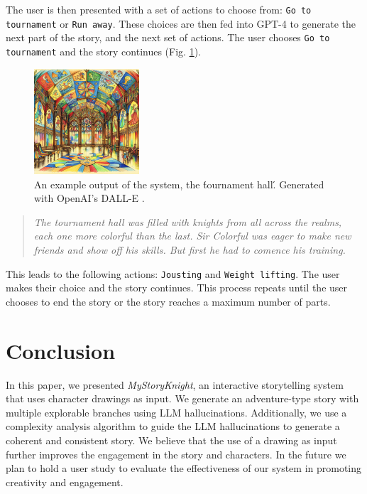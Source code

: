\documentclass[submit,techrep,english]{ipsj}
\begin{document}
The user is then presented with a set of actions to choose from: \verb|Go to tournament| or \verb|Run away|. These choices are then fed into GPT-4 to generate the next part of the story, and the next set of actions. The user chooses \verb|Go to tournament| and the story continues (Fig. \ref{fig:tournament}).

\vspace{10pt} %

\begin{figure}[h]
    \centering
    \includegraphics[width=0.35\textwidth]{figures/tournament-hall.png}
    \caption{An example output of the system, the \'tournament hall\'. Generated with OpenAI's DALL-E \cite{21:dalle}.}
    \label{fig:tournament}
\end{figure}

\begin{quote}
    \textit{The tournament hall was filled with knights from all across the realms, each one more colorful than the last. Sir Colorful was eager to make new friends and show off his skills. But first he had to comence his training.}
\end{quote}

\vspace{10pt} %

This leads to the following actions: \verb|Jousting| and \verb|Weight lifting|. The user makes their choice and the story continues. This process repeats until the user chooses to end the story or the story reaches a maximum number of parts.

\section{Conclusion}
\label{sec:conclusion}
In this paper, we presented \textit{MyStoryKnight}, an interactive storytelling system that uses character drawings as input. We generate an adventure-type story with multiple explorable branches using LLM hallucinations. Additionally, we use a complexity analysis algorithm to guide the LLM hallucinations to generate a coherent and consistent story. We believe that the use of a drawing as input further improves the engagement in the story and characters. In the future we plan to hold a user study to evaluate the effectiveness of our system in promoting creativity and engagement.





\end{document}

